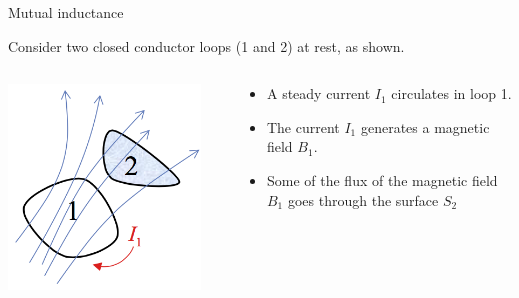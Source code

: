 \begin{frame}{Mutual inductance}

Consider two closed conductor loops (1 and 2) at rest, as shown.

\begin{columns}
  \begin{column}{0.55\textwidth}
    \begin{center}
       \includegraphics[width=0.90\textwidth]{./images/schematics/mutual_inductance_1.png}\\
     \end{center}
  \end{column}
  \begin{column}{0.45\textwidth}
     \begin{itemize}
        \item A steady current $I_1$ circulates in loop 1.
        \vspace{0.4cm}
        \item The current $I_1$ generates a magnetic field $B_1$.
        \vspace{0.4cm}
        \item Some of the flux of the magnetic field $B_1$ goes through the surface $S_2$
     \end{itemize}
  \end{column}
\end{columns}

\end{frame}

